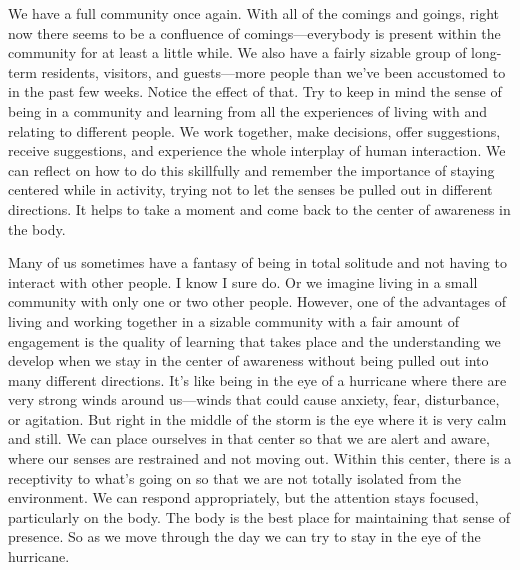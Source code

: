 
We have a full community once again. With all of the comings and 
goings, right now there seems to be a confluence of comings---everybody 
is present within the community for at least a little while. We also 
have a fairly sizable group of long-term residents, visitors, and 
guests---more people than we've been accustomed to in the past few 
weeks. Notice the effect of that. Try to keep in mind the sense of 
being in a community and learning from all the experiences of living 
with and relating to different people. We work together, make 
decisions, offer suggestions, receive suggestions, and experience the 
whole interplay of human interaction. We can reflect on how to do this 
skillfully and remember the importance of staying centered while in 
activity, trying not to let the senses be pulled out in different 
directions. It helps to take a moment and come back to the center of 
awareness in the body.

Many of us sometimes have a fantasy of being in total solitude and not 
having to interact with other people. I know I sure do. Or we imagine 
living in a small community with only one or two other people. However, 
one of the advantages of living and working together in a sizable 
community with a fair amount of engagement is the quality of learning 
that takes place and the understanding we develop when we stay in the 
center of awareness without being pulled out into many different 
directions. It's like being in the eye of a hurricane where there are 
very strong winds around us---winds that could cause anxiety, fear, 
disturbance, or agitation. But right in the middle of the storm is the 
eye where it is very calm and still. We can place ourselves in that 
center so that we are alert and aware, where our senses are restrained 
and not moving out. Within this center, there is a receptivity to 
what's going on so that we are not totally isolated from the 
environment. We can respond appropriately, but the attention stays 
focused, particularly on the body. The body is the best place for 
maintaining that sense of presence. So as we move through the day we 
can try to stay in the eye of the hurricane.

